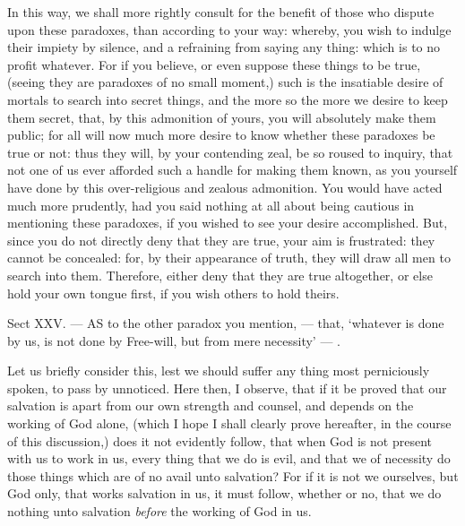 In this way, we shall more rightly consult for the benefit of those who dispute upon these paradoxes, than according to your way: whereby, you wish to indulge their impiety by silence, and a refraining from saying any thing: which is to no profit whatever. For if you believe, or even suppose these things to be true, (seeing they are paradoxes of no small moment,) such is the insatiable desire of mortals to search into secret things, and the more so the more we desire to keep them secret, that, by this admonition of yours, you will absolutely make them public; for all will now much more desire to know whether these paradoxes be true or not: thus they will, by your contending zeal, be so roused to inquiry, that not one of us ever afforded such a handle for making them known, as you yourself have done by this over-religious and zealous admonition. You would have acted much more prudently, had you said nothing at all about being cautious in mentioning these paradoxes, if you wished to see your desire accomplished. But, since you do not directly deny that they are true, your aim is frustrated: they cannot be concealed: for, by their appearance of truth, they will draw all men to search into them. Therefore, either deny that they are true altogether, or else hold your own tongue first, if you wish others to hold theirs.


Sect XXV. — AS to the other paradox you mention, — that, ‘whatever is done by us, is not done by Free-will, but from mere necessity’ — .

Let us briefly consider this, lest we should suffer any thing most perniciously spoken, to pass by unnoticed. Here then, I observe, that if it be proved that our salvation is apart from our own strength and counsel, and depends on the working of God alone, (which I hope I shall clearly prove hereafter, in the course of this discussion,) does it not evidently follow, that when God is not present with us to work in us, every thing that we do is evil, and that we of necessity do those things which are of no avail unto salvation? For if it is not we ourselves, but God only, that works salvation in us, it must follow, whether or no, that we do nothing unto salvation \emph{before }the working of God in us.

